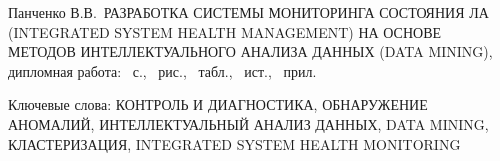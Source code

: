 \newcommand{\thesistitle}{Разработка системы мониторинга состояния ЛА (Integrated System Health Management) на основе методов интеллектуального анализа данных (Data Mining)}
\newcommand{\thesisauthor}{Панченко В.В.}
\newcommand{\thesiskeywords}{контроль и диагностика, обнаружение аномалий, интеллектуальный анализ данных, Data Mining, кластеризация, Integrated System Health Monitoring}

\protect{}
\sloppy
{
\thesisauthor\ \MakeUppercase{\thesistitle}, дипломная работа: \pagecount~с., ~рис., ~табл., ~ист., ~прил.

Ключевые слова: \MakeUppercase{\thesiskeywords}
}